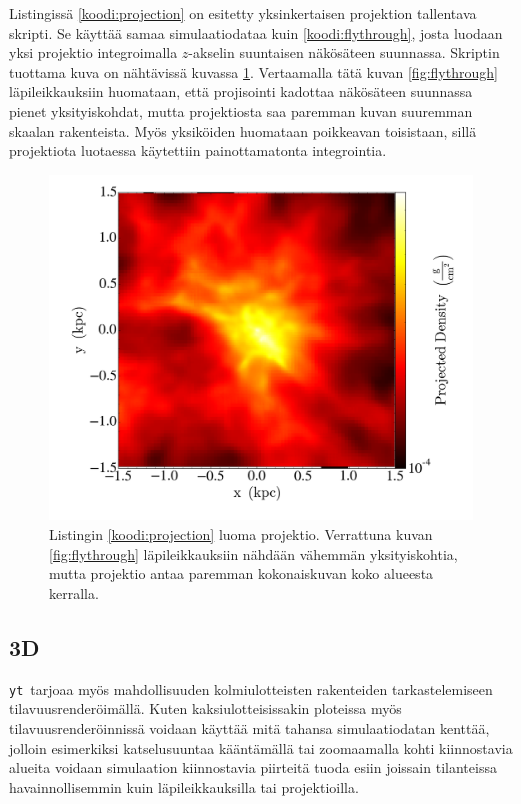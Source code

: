 \documentclass[12pt,a4paper]{article}
\newcommand{\yt}{\texttt{yt}}
\begin{document}
Listingissä \ref{koodi:projection} on esitetty yksinkertaisen projektion tallentava skripti. Se käyttää samaa simulaatiodataa kuin \ref{koodi:flythrough}, josta luodaan yksi projektio integroimalla $z$-akselin suuntaisen näkösäteen suunnassa. Skriptin tuottama kuva on nähtävissä kuvassa \ref{fig:projection}. Vertaamalla tätä kuvan \ref{fig:flythrough} läpileikkauksiin huomataan, että projisointi kadottaa näkösäteen suunnassa pienet yksityiskohdat, mutta projektiosta saa paremman kuvan suuremman skaalan rakenteista. Myös yksiköiden huomataan poikkeavan toisistaan, sillä projektiota luotaessa käytettiin painottamatonta integrointia.

\begin{minipage}{\linewidth}

\end{minipage}

\begin{figure}
   \centering
   \includegraphics[width=.7\textwidth]{../kuvat/projection.png}
   \caption{Listingin \ref{koodi:projection} luoma projektio. Verrattuna kuvan \ref{fig:flythrough} läpileikkauksiin nähdään vähemmän yksityiskohtia, mutta projektio antaa paremman kokonaiskuvan koko alueesta kerralla.} \label{fig:projection}
\end{figure}


\subsection{3D}
\yt\ tarjoaa myös mahdollisuuden kolmiulotteisten rakenteiden tarkastelemiseen tilavuusrenderöimällä. Kuten kaksiulotteisissakin ploteissa myös tilavuusrenderöinnissä voidaan käyttää mitä tahansa simulaatiodatan kenttää, jolloin esimerkiksi katselusuuntaa kääntä\-mällä tai zoomaamalla kohti kiinnostavia alueita voidaan simulaation kiinnostavia piirteitä tuoda esiin joissain tilanteissa havainnollisemmin kuin läpileikkauksilla tai projektioilla. \cite{volume}
\end{document}
